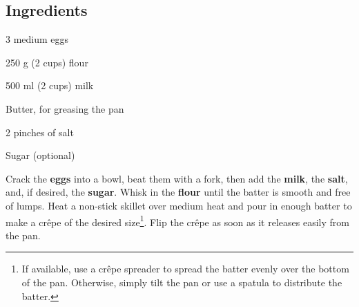\newpage
{}

\subsection*{Ingredients}
\begin{ingredients}
	\item 3 medium eggs
	\item 250 g (2 cups) flour
	\item 500 ml (2 cups) milk
	\item Butter, for greasing the pan
	\item 2 pinches of salt
	\item Sugar (optional)
\end{ingredients}

\medskip

Crack the \textbf{eggs} into a bowl, beat them with a fork, then add the \textbf{milk}, the \textbf{salt}, and, if desired, the \textbf{sugar}.
Whisk in the \textbf{flour} until the batter is smooth and free of lumps.
Heat a non-stick skillet over medium heat and pour in enough batter to make a crêpe of the desired size\footnote{If available, use a crêpe spreader to spread the batter evenly over the bottom of the pan. Otherwise, simply tilt the pan or use a spatula to distribute the batter.}.
Flip the crêpe as soon as it releases easily from the pan.

\vspace*{0.75 cm}

\begin{recipeblock}
	\noindent 
\end{recipeblock}